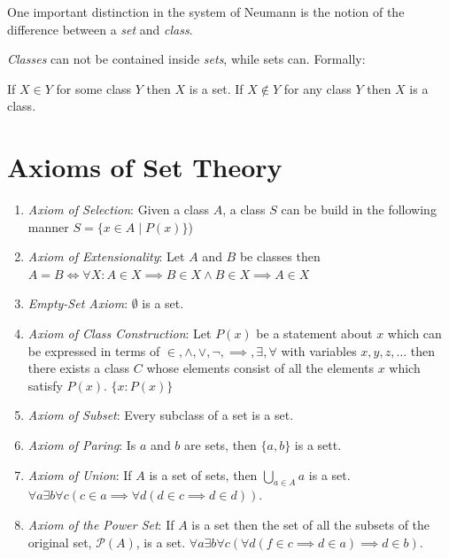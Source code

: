 One important distinction in the system of Neumann is the notion of the difference between a \emph{set} and \emph{class}.

\emph{Classes} can not be contained inside \emph{sets}, while sets can. Formally:

If \(X \in Y\) for some class \(Y\) then \(X\) is a set. If \(X \notin Y\) for any class \(Y\) then \(X\) is a class.

\section{Axioms of Set Theory}

\begin{enumerate}[label = \Roman*.]

	\item \emph{Axiom of Selection}: Given a class \(A\), a class \(S\) can be build in the following manner \(S = \{x \in A \mid P(x)\}\))

	\item \emph{Axiom of Extensionality}: Let \(A\) and \(B\) be classes then \(A = B \iff \forall X : A \in X \implies B \in X \land B \in X \implies A \in X\)

	\item \emph{Empty-Set Axiom}: \(\emptyset\) is a set.

	\item \emph{Axiom of Class Construction}: Let \(P(x)\) be a statement about \(x\) which can be expressed in terms of \(\in, \land, \lor ,\neg, \implies, \exists, \forall \)
	      with variables \(x,y,z,\dots\) then there exists a class \(C\) whose elements consist of all the elements \(x\) which satisfy \(P(x)\). \(\{x : P(x)\}\)

	\item \emph{Axiom of Subset}: Every subclass of a set is a set.

	\item \emph{Axiom of Paring}: Is \(a\) and \(b\) are sets, then \(\{a, b\}\) is a sett.

	\item \emph{Axiom of Union}: If \(A\) is a set of sets, then \(\bigcup_{a \in A} a\) is a set. \(\forall a \exists b \forall c(c \in a \implies \forall d (d \in c \implies d \in d))\).

	\item \emph{Axiom of the Power Set}: If \(A\) is a set then the set of all the subsets of the original set, \(\mathcal{P}(A)\), is a set.
	      \(\forall a \exists b \forall c (\forall d (f \in c \implies d \in a) \implies d \in b)\).


\end{enumerate}
